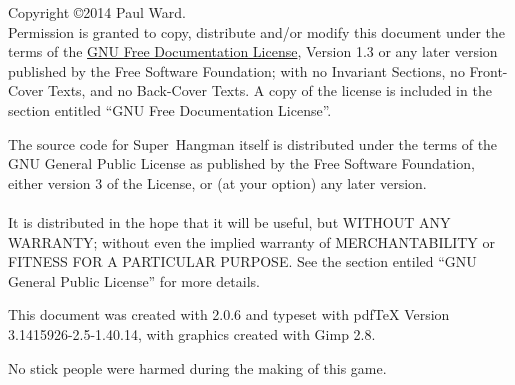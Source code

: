 \noindent \begin{center}
\parbox[t]{0.95\columnwidth}{%
\noindent Copyright \copyright 2014 Paul Ward.\\


\noindent Permission is granted to copy, distribute and/or modify
this document under the terms of the \href{http://www.gnu.org/licenses/fdl.html}{GNU Free Documentation License},
Version 1.3 or any later version published by the Free Software Foundation;
with no Invariant Sections, no Front-Cover Texts, and no Back-Cover
Texts. A copy of the license is included in the section entitled ``GNU
Free Documentation License''.

\bigskip

The source code for \mbox{Super Hangman} itself is distributed under
the terms of the GNU General Public License as published by the Free
Software Foundation, either version 3 of the License, or (at your
option) any later version.\\
\\
It is distributed in the hope that it will be useful, but WITHOUT
ANY WARRANTY; without even the implied warranty of MERCHANTABILITY
or FITNESS FOR A PARTICULAR PURPOSE. See the section entiled ``GNU
General Public License'' for more details.\\
\bigskip

This document was created with \LyX{} 2.0.6 and typeset with pdf\TeX{}
Version 3.1415926-2.5-1.40.14, with graphics created with Gimp 2.8.\\
\bigskip

No stick people were harmed during the making of this game.%
}
\par\end{center}
